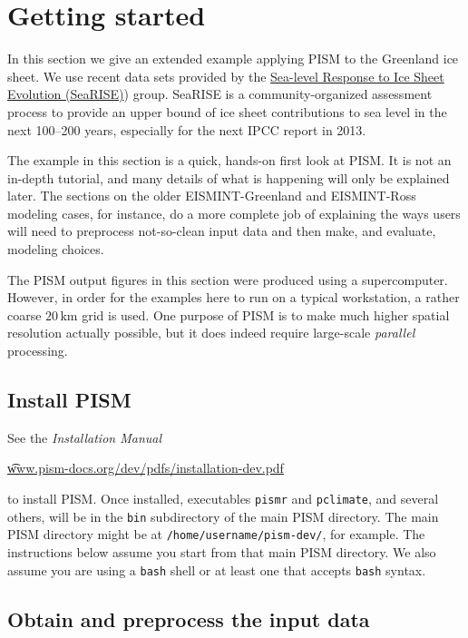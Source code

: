 
\section{Getting started}\label{sect:start}

In this section we give an extended example applying PISM to the Greenland ice sheet.  We use recent data sets provided by the \href{http://websrv.cs.umt.edu/isis/index.php/SeaRISE_Assessment}{Sea-level Response to Ice Sheet Evolution (SeaRISE)}) group.  SeaRISE is a community-organized assessment process to provide an upper bound of ice sheet contributions to sea level in the next 100--200 years, especially for the next IPCC report in 2013.

The example in this section is a quick, hands-on first look at PISM.  It is not an in-depth tutorial, and many details of what is happening will only be explained later.  The sections on the older EISMINT-Greenland and EISMINT-Ross modeling cases, for instance, do a more complete job of explaining the ways users will need to preprocess not-so-clean input data and then make, and evaluate, modeling choices.

The PISM output figures in this section were produced using a supercomputer.  However, in order for the examples here to run on a typical workstation, a rather coarse $20\,\textrm{km}$ grid is used.  One purpose of PISM is to make much higher spatial resolution actually possible, but it does indeed require large-scale \emph{parallel} processing.


\subsection{Install PISM}

See the \emph{Installation Manual}
   \begin{center}
     \href{http://www.pism-docs.org/dev/pdfs/installation-dev.pdf}{\t{www.pism-docs.org/dev/pdfs/installation-dev.pdf}}
   \end{center}
to install PISM.  Once installed, executables \verb|pismr| and \verb|pclimate|, and several others, will be in the \verb|bin| subdirectory of the main PISM directory.  The main PISM directory might be at \verb|/home/username/pism-dev/|, for example.  The instructions below assume you start from that main PISM directory.  We also assume you are using a \verb|bash| shell or at least one that accepts \verb|bash| syntax.


\subsection{Obtain and preprocess the input data}

